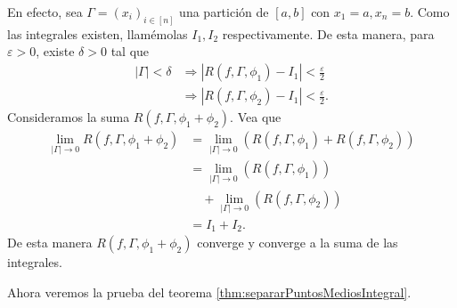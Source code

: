 \documentclass[12pt]{article}
\theoremstyle{plain}
\theoremstyle{definition}
\theoremstyle{remark}
\numberwithin{equation}{section}
\renewcommand{\:}{\colon}           %
\newcommand{\bonj}[1]{\left\lbrack#1\right\rbrack}
\begin{document}
\begin{multicols}{2}
\begin{ptcb}
En efecto, sea $\Gamma=(x_i)_{i\in\bonj{n}}$ una partición de $\bonj{a,b}$ con $x_1=a, x_n=b$. Como las integrales existen, llamémolas $I_1, I_2$ respectivamente. De esta manera, para $\varepsilon>0$, existe $\delta>0$ tal que
\begin{align*}
  |\Gamma|<\delta &\Rightarrow |R(f,\Gamma,\phi_1)-I_1|<\frac{\varepsilon}{2}\\
  &\Rightarrow |R(f,\Gamma,\phi_2)-I_1|<\frac{\varepsilon}{2}.
\end{align*}
Consideramos la suma $R(f,\Gamma,\phi_1+\phi_2)$. Vea que
\begin{align*}
  \lim_{|\Gamma|\to 0}R(f,\Gamma,\phi_1+\phi_2) &=\lim_{|\Gamma|\to 0}( R(f,\Gamma,\phi_1)+R(f,\Gamma,\phi_2))\\
  &=\lim_{|\Gamma|\to 0}( R(f,\Gamma,\phi_1))\\
  &\quad+\lim_{|\Gamma|\to 0}(R(f,\Gamma,\phi_2))\\
  &=I_1+I_2.
\end{align*}
De esta manera $R(f,\Gamma,\phi_1+\phi_2)$ converge y converge a la suma de las integrales.
\end{ptcb}

Ahora veremos la prueba del teorema \ref{thm:separarPuntosMediosIntegral}.

\begin{ptcb}


\end{ptcb}
\end{multicols}
\end{document}
